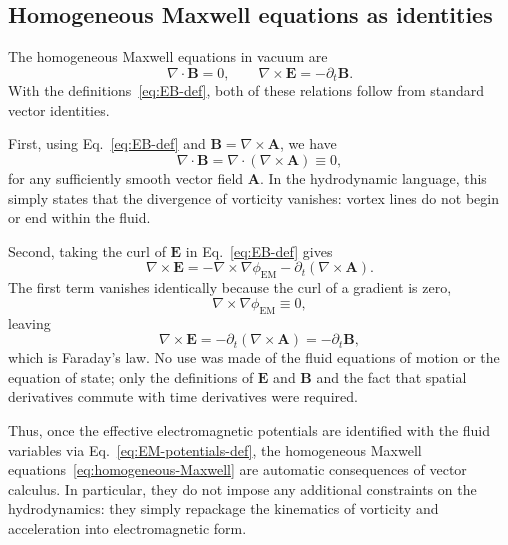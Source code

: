 \documentclass[11pt]{article}
\begin{document}
\subsection{Homogeneous Maxwell equations as identities}

The homogeneous Maxwell equations in vacuum are
\begin{equation}
\nabla \cdot \mathbf{B} = 0,
\qquad
\nabla \times \mathbf{E} = -\partial_t \mathbf{B}.
\label{eq:homogeneous-Maxwell}
\end{equation}
With the definitions~\eqref{eq:EB-def}, both of these relations follow from standard vector identities.

First, using Eq.~\eqref{eq:EB-def} and $\mathbf{B} = \nabla \times \mathbf{A}$, we have
\begin{equation}
\nabla \cdot \mathbf{B}
= \nabla \cdot (\nabla \times \mathbf{A})
\equiv 0,
\label{eq:divB-zero}
\end{equation}
for any sufficiently smooth vector field $\mathbf{A}$.  In the hydrodynamic language, this simply states that the divergence of vorticity vanishes: vortex lines do not begin or end within the fluid.

Second, taking the curl of $\mathbf{E}$ in Eq.~\eqref{eq:EB-def} gives
\begin{equation}
\nabla \times \mathbf{E}
= -\nabla \times \nabla \phi_{\mathrm{EM}} - \partial_t (\nabla \times \mathbf{A}).
\label{eq:curlE-step}
\end{equation}
The first term vanishes identically because the curl of a gradient is zero,
\begin{equation}
\nabla \times \nabla \phi_{\mathrm{EM}} \equiv 0,
\end{equation}
leaving
\begin{equation}
\nabla \times \mathbf{E}
= -\partial_t (\nabla \times \mathbf{A})
= -\partial_t \mathbf{B},
\label{eq:Faraday-identity}
\end{equation}
which is Faraday's law.  No use was made of the fluid equations of motion or the equation of state; only the definitions of $\mathbf{E}$ and $\mathbf{B}$ and the fact that spatial derivatives commute with time derivatives were required.

Thus, once the effective electromagnetic potentials are identified with the fluid variables via Eq.~\eqref{eq:EM-potentials-def}, the homogeneous Maxwell equations~\eqref{eq:homogeneous-Maxwell} are automatic consequences of vector calculus.  In particular, they do not impose any additional constraints on the hydrodynamics: they simply repackage the kinematics of vorticity and acceleration into electromagnetic form.
\end{document}
